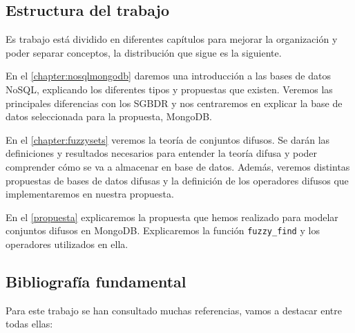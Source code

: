 \subsection{Estructura del trabajo}

Es trabajo está dividido en diferentes capítulos para mejorar la organización y poder separar conceptos, la distribución que sigue es la siguiente.

En el \autoref{chapter:nosqlmongodb} daremos una introducción a las bases de datos NoSQL, explicando los diferentes tipos y propuestas que existen. Veremos las principales diferencias con los SGBDR y nos centraremos en explicar la base de datos seleccionada para la propuesta, MongoDB.

En el \autoref{chapter:fuzzysets} veremos la teoría de conjuntos difusos. Se darán las definiciones y resultados necesarios para entender la teoría difusa y poder comprender cómo se va a almacenar en base de datos. Además, veremos distintas propuestas de bases de datos difusas y la definición de los operadores difusos que implementaremos en nuestra propuesta.

En el \autoref{propuesta} explicaremos la propuesta que hemos realizado para modelar conjuntos difusos en MongoDB. Explicaremos la función \texttt{fuzzy\_find} y los operadores utilizados en ella.

\subsection{Bibliografía fundamental}

Para este trabajo se han consultado muchas referencias, vamos a destacar entre todas ellas:


